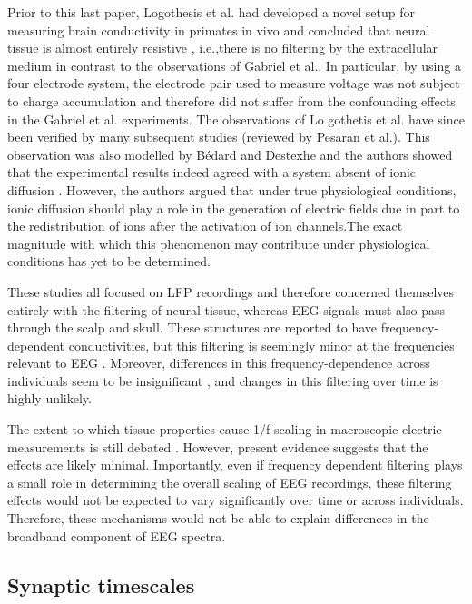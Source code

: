 Prior to this last paper, Logothesis et al. had developed a novel setup for measuring brain conductivity in primates in vivo and concluded that neural tissue is almost entirely resistive \cite{Logothetis2007}, i.e.,there is no filtering by the extracellular medium in contrast to the observations of Gabriel et al.\cite{Gabriel1996}. In particular, by using a four electrode system, the electrode pair used to measure voltage was not subject to charge accumulation and therefore did not suffer from the confounding effects in the Gabriel et al. experiments. The observations of Lo gothetis et al. have since been verified by many subsequent studies (reviewed by Pesaran et al.\cite{Pesaran2018}). This observation was also modelled by Bédard and Destexhe and the authors showed that the experimental results indeed agreed with a system absent of ionic diffusion \cite{Bedard2006a}. However, the authors argued that under true physiological conditions, ionic diffusion should play a role in the generation of electric fields due in part to the redistribution of ions after the activation of ion channels.The exact magnitude with which this phenomenon may contribute under physiological conditions has yet to be determined.

These studies all focused on LFP recordings and therefore concerned themselves entirely with the filtering of neural tissue, whereas EEG signals must also pass through the scalp and skull. These structures are reported to have frequency-dependent conductivities, but this filtering is seemingly minor at the frequencies relevant to EEG \cite{Pfurtscheller1975, Akhtari2002, Pesaran2018}. Moreover, differences in this frequency-dependence across individuals seem to be insignificant \cite{Akhtari2002}, and changes in this filtering over time is highly unlikely. 

The extent to which tissue properties cause 1/f scaling in macroscopic electric measurements is still debated \cite{Bedard2017}. However, present evidence suggests that the effects are likely minimal. Importantly, even if frequency dependent filtering plays a small role in determining the overall scaling of EEG recordings, these filtering effects would not be expected to vary significantly over time or across individuals. Therefore, these mechanisms would not be able to explain differences in the broadband component of EEG spectra. 

\subsection{Synaptic timescales}

